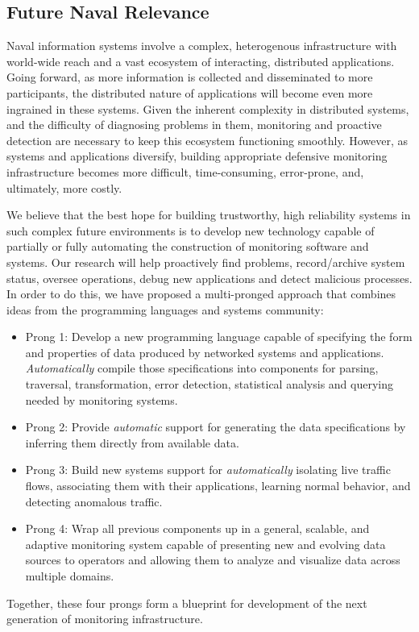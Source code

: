 \subsection{Future Naval Relevance}
\label{sec:naval}

Naval information systems involve a complex, heterogenous
infrastructure with world-wide reach and a vast ecosystem of
interacting, distributed applications. Going forward, as more
information is collected and disseminated to more participants, the
distributed nature of applications will become even more ingrained in
these systems. Given the inherent complexity in distributed systems,
and the difficulty of diagnosing problems in them, monitoring and
proactive detection are necessary to keep this ecosystem functioning
smoothly.  However, as systems and applications diversify, building
appropriate defensive monitoring infrastructure becomes more
difficult, time-consuming, error-prone, and, ultimately, more costly.

We believe that the best hope for building trustworthy, high
reliability systems in such complex future environments is to develop
new technology capable of partially or fully automating the
construction of monitoring software and systems.  Our research will
help proactively find problems, record/archive system status, oversee
operations, debug new applications and detect malicious processes.  In
order to do this, we have proposed a multi-pronged approach that
combines ideas from the programming languages and systems community:

\begin{itemize}
\item Prong 1:  Develop a new programming language capable of specifying the 
form and properties of data produced by networked systems and 
applications.  {\em Automatically} compile those specifications into 
components for parsing, traversal, transformation, error detection,
statistical analysis and querying needed by monitoring systems.

\item Prong 2:  Provide {\em automatic} support for generating the data 
specifications by inferring them directly from available data.

\item Prong 3:  Build new systems support for {\em automatically}
isolating live traffic flows, associating them with their applications,
learning normal behavior, and detecting anomalous traffic.

\item Prong 4:  Wrap all previous components up in a general, scalable,
and adaptive monitoring system capable of
presenting new and evolving data sources to operators and allowing them to
analyze and visualize data across multiple domains.
\end{itemize}

Together, these four prongs form a blueprint for development of the
next generation of monitoring infrastructure.